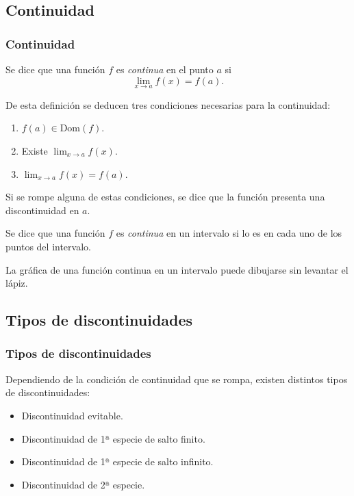 \subsection{Continuidad}
\begin{frame}
\frametitle{Continuidad}
\begin{definicion}
Se dice que una función $f$ es \emph{continua} en el punto $a$ si
\[ \lim_{x\rightarrow a}f(x)=f(a).\]
\end{definicion}

De esta definición se deducen tres condiciones necesarias para la continuidad:
\begin{enumerate}
\item  $f(a)\in \textrm{Dom}(f)$.
\item  Existe $\displaystyle \lim_{x\rightarrow a}f(x)$.
\item  $\displaystyle \lim_{x\rightarrow a}f(x)=f(a)$.
\end{enumerate}

Si se rompe alguna de estas condiciones, se dice que la función presenta una discontinuidad en $a$.

\begin{definicion}
Se dice que una función $f$ es \emph{continua} en un intervalo si lo es en cada uno de los puntos del intervalo.
\end{definicion}

La gráfica de una función continua en un intervalo puede dibujarse sin levantar el lápiz.
\end{frame}



\subsection{Tipos de discontinuidades}
\begin{frame}
\frametitle{Tipos de discontinuidades}
Dependiendo de la condición de continuidad que se rompa, existen distintos tipos de  discontinuidades:
\begin{itemize}
\item Discontinuidad evitable.
\item Discontinuidad de 1ª especie de salto finito.
\item Discontinuidad de 1ª especie de salto infinito.
\item Discontinuidad de 2ª especie.
\end{itemize}
\end{frame}


